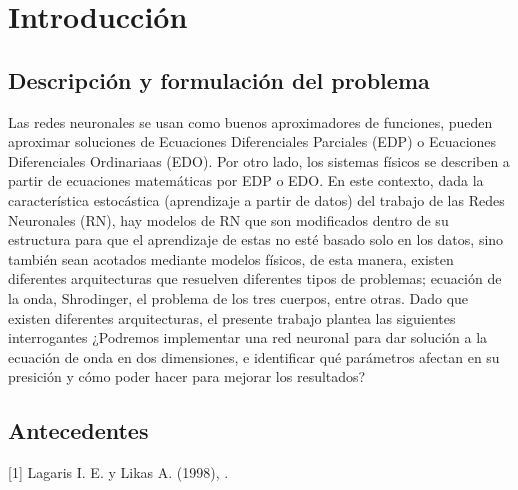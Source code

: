 \chapter{Introducción}

\thispagestyle{empty}
% 
% 
% 
% 
\section{Descripción y formulación del problema}
Las redes neuronales se usan como buenos aproximadores de funciones, pueden aproximar soluciones de Ecuaciones Diferenciales Parciales (EDP) o Ecuaciones Diferenciales Ordinariaas (EDO). Por otro lado, los sistemas físicos se describen a partir de ecuaciones matemáticas por EDP o EDO. En este contexto, dada la característica estocástica (aprendizaje a partir de datos) del trabajo de las Redes Neuronales (RN), hay modelos de RN que son modificados dentro de su estructura para que el aprendizaje de estas no esté basado solo en los datos, sino también sean acotados mediante modelos físicos, de esta manera, existen diferentes arquitecturas que resuelven diferentes tipos de problemas; ecuación de la onda, Shrodinger, el problema de los tres cuerpos, entre otras. Dado que existen diferentes arquitecturas, el presente trabajo plantea las siguientes interrogantes  ¿Podremos implementar una red neuronal para dar solución a la ecuación de onda en dos dimensiones, e identificar qué parámetros afectan en su presición y cómo poder hacer para mejorar los resultados?

% 
% 
% 
% 
\section{Antecedentes}
[1] Lagaris I. E. y Likas A. (1998), . 

